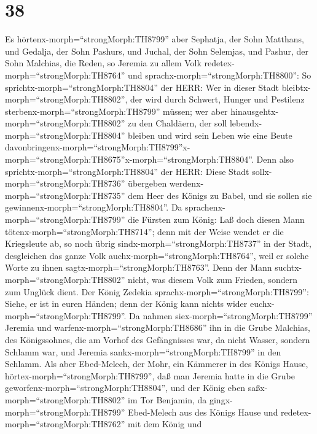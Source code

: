 \hypertarget{section-37}{%
\section{38}\label{section-37}}

 Es hörtenx-morph=``strongMorph:TH8799'' aber Sephatja, der
Sohn Matthans, und Gedalja, der Sohn Pashurs, und Juchal, der Sohn
Selemjas, und Pashur, der Sohn Malchias, die Reden, so Jeremia zu allem
Volk redetex-morph=``strongMorph:TH8764'' und
sprachx-morph=``strongMorph:TH8800'':  So
sprichtx-morph=``strongMorph:TH8804'' der HERR: Wer in dieser Stadt
bleibtx-morph=``strongMorph:TH8802'', der wird durch Schwert, Hunger und
Pestilenz sterbenx-morph=``strongMorph:TH8799'' müssen; wer aber
hinausgehtx-morph=``strongMorph:TH8802'' zu den Chaldäern, der soll
lebendx-morph=``strongMorph:TH8804'' bleiben und wird sein Leben wie
eine Beute
davonbringenx-morph=``strongMorph:TH8799''\textbar x-morph=``strongMorph:TH8675''x-morph=``strongMorph:TH8804''.
 Denn also sprichtx-morph=``strongMorph:TH8804'' der HERR:
Diese Stadt sollx-morph=``strongMorph:TH8736'' übergeben
werdenx-morph=``strongMorph:TH8735'' dem Heer des Königs zu Babel, und
sie sollen sie gewinnenx-morph=``strongMorph:TH8804''.  Da
sprachenx-morph=``strongMorph:TH8799'' die Fürsten zum König: Laß doch
diesen Mann tötenx-morph=``strongMorph:TH8714''; denn mit der Weise
wendet er die Kriegsleute ab, so noch übrig
sindx-morph=``strongMorph:TH8737'' in der Stadt, desgleichen das ganze
Volk auchx-morph=``strongMorph:TH8764'', weil er solche Worte zu ihnen
sagtx-morph=``strongMorph:TH8763''. Denn der Mann
suchtx-morph=``strongMorph:TH8802'' nicht, was diesem Volk zum Frieden,
sondern zum Unglück dient.  Der König Zedekia
sprachx-morph=``strongMorph:TH8799'': Siehe, er ist in euren Händen;
denn der König kann nichts wider euchx-morph=``strongMorph:TH8799''.
 Da nahmen siex-morph=``strongMorph:TH8799'' Jeremia und
warfenx-morph=``strongMorph:TH8686'' ihn in die Grube Malchias, des
Königssohnes, die am Vorhof des Gefängnisses war, da nicht Wasser,
sondern Schlamm war, und Jeremia sankx-morph=``strongMorph:TH8799'' in
den Schlamm.  Als aber Ebed-Melech, der Mohr, ein Kämmerer
in des Königs Hause, hörtex-morph=``strongMorph:TH8799'', daß man
Jeremia hatte in die Grube geworfenx-morph=``strongMorph:TH8804'', und
der König eben saßx-morph=``strongMorph:TH8802'' im Tor Benjamin,
 da gingx-morph=``strongMorph:TH8799'' Ebed-Melech aus des
Königs Hause und redetex-morph=``strongMorph:TH8762'' mit dem König und
